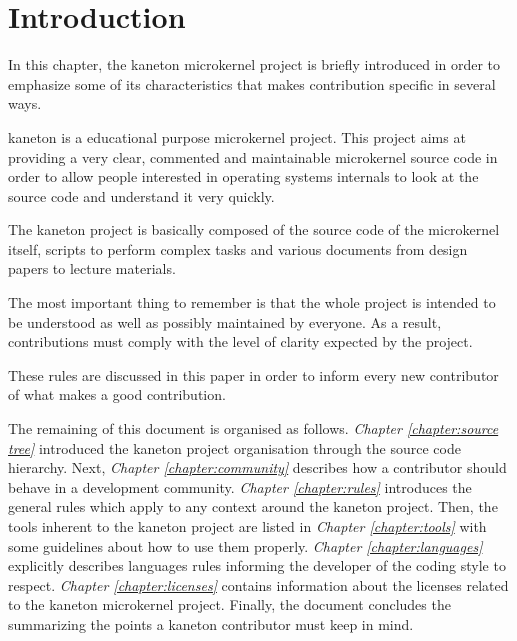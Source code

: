 %
%
%
%
%
%

%
%

\chapter{Introduction}
\label{chapter:environment}

In this chapter, the kaneton microkernel project is briefly introduced
in order to emphasize some of its characteristics that makes contribution
specific in several ways.

\newpage

%
%

kaneton is a educational purpose microkernel project. This project aims
at providing a very clear, commented and maintainable microkernel source
code in order to allow people interested in operating systems internals
to look at the source code and understand it very quickly.

The kaneton project is basically composed of the source code of the
microkernel itself, scripts to perform complex tasks and various documents
from design papers to lecture materials.

The most important thing to remember is that the whole project is intended
to be understood as well as possibly maintained by everyone. As a result,
contributions must comply with the level of clarity expected by the project.

These rules are discussed in this paper in order to inform every new
contributor of what makes a good contribution.

The remaining of this document is organised as follows. \textit{Chapter
\ref{chapter:source tree}} introduced the kaneton project organisation
through the source code hierarchy. Next, \textit{Chapter
\ref{chapter:community}} describes how a contributor should behave in a
development community. \textit{Chapter \ref{chapter:rules}} introduces the
general rules which apply to any context around the kaneton project. Then,
the tools inherent to the kaneton project are listed in \textit{Chapter
\ref{chapter:tools}} with some guidelines about how to use them properly.
\textit{Chapter \ref{chapter:languages}} explicitly describes languages rules
informing the developer of the coding style to respect. \textit{Chapter
\ref{chapter:licenses}} contains information about the licenses related to
the kaneton microkernel project. Finally, the document concludes the
summarizing the points a kaneton contributor must keep in mind.
